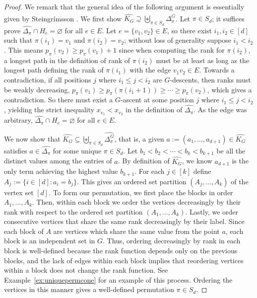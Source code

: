 \documentclass[11pt]{amsart}
\renewcommand\emptyset{\varnothing}
\newcommand{\rk}[1][\pi]{p_{#1}}
\begin{document}
\begin{proof}
We remark that the general idea of the following argument is essentially given by Steingrímsson \cite[Theorem~6]{steingrimssoncoloring}.
We first show $\widehat{K_G} \supseteq \biguplus_{\pi \in S_d} \widehat{\Delta_{\pi}^G}$.
Let $\pi \in S_d$; it suffices prove $\widehat{\Delta_{\pi}} \cap H_e = \emptyset$ for all $e \in E$. 
Let $e=\{v_1,v_2\} \in E$, so there exist $i_1,i_2 \in [d]$ such that $\pi(i_1) = v_1$ and $\pi(i_2) = v_2$; without loss of generality suppose $i_1 < i_2$. 
This means $\rk(v_2) \geq \rk(v_1)+1$ since when computing the rank for $\pi(i_2)$, a longest path in the definition of rank of $\pi(i_2)$ must be at least as long as the longest path defining the rank of $\pi(i_1)$ with the edge $v_1 v_2 \in E$. 
Towards a contradiction, if all positions $j$ where $i_1 \leq j < i_2$ are $G$-descents, then ranks must be
weakly decreasing, $\rk(v_1) \geq \rk(\pi(i_1 +1)) \geq \cdots \geq \rk(v_2)$, which gives a contradiction. 
So there must exist a $G$-ascent at some position $j$ where $i_1 \leq j < i_2$, yielding  
the strict inequality $x_{v_1} < x_{v_2}$ in the definition of $\widehat{\Delta_{\pi}}$. As the edge was arbitrary, $\widehat{\Delta_{\pi}} \cap H_e = \emptyset$ for all $e \in E$.

We now show that  $\widehat{K_G} \subseteq \biguplus_{\pi \in S_d} \widehat{\Delta_{\pi}^G}$, that is, a given $a := (a_1,\ldots,a_{d+1}) \in \widehat{K_G}$ satisfies $a \in \widehat{\Delta_{\pi}}$ for some unique $\pi \in S_d$. 
Let $b_1 < b_2 < \cdots < b_k<b_{k+1}$ be all the distinct values among the entries of $a$.
By definition of $\widehat{K_G}$, we know $a_{d+1}$ is the only term achieving the highest value $b_{k+1}$.
For each $j \in [k]$ define $A_{j} :=\{i  \in [d] : a_i = b_j\}$. %
This gives an ordered set partition $(A_j,\ldots,A_{k})$ of the vertex set $[d]$.
To form our permutation, we first place the blocks in order $A_1,\ldots,A_k$. 
Then, within each block we order the vertices decreasingly by their rank with respect to the ordered set partition $(A_1,\ldots,A_k)$.
Lastly, we order consecutive vertices that share the same rank decreasingly by their label. 
Since each block of $A$ are vertices which share the same value from the point $a$, each block is an independent set in $G$.
Thus, ordering decreasingly by rank in each block is well-defined because the rank function depends only on the previous blocks, and the lack of edges within each block implies that reordering vertices within a block does not change the rank function.
See Example~\ref{ex:uniquepermcone} for an example of this process. 
Ordering the vertices in this manner gives a well-defined permutation $\pi \in S_d$.


\end{proof}
\end{document}
